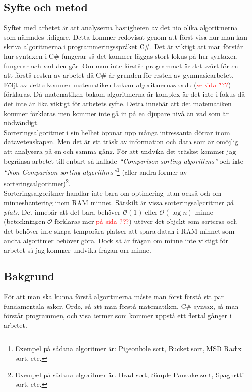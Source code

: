 \documentclass[a4]{article}
\begin{document}
\subsection{Syfte och metod}
Syftet med arbetet är att analyserna hastigheten av det nio olika algoritmerna som nämndes tidigare. Detta kommer redovisat genom att först visa hur man kan skriva algoritmerna i programmeringsspråket C\#. Det är viktigt att man förstår hur syntaxen i C\# fungerar så det kommer läggas stort fokus på hur syntaxen fungerar och vad den gör. Om man inte förstår programmet är det svårt för en att förstå resten av arbetet då C\# är grunden för resten av gymnasiearbetet. Följt av detta kommer matematiken bakom algoritmernas ordo (\textcolor{red}{se sida ???}) förklaras. Då matematiken bakom algoritmerna är komplex är det inte i fokus då det inte är lika viktigt för arbetets syfte. Detta innebär att det matematiken kommer förklaras men kommer inte gå in på en djupare nivå än vad som är nödvändigt.\\
Sorteringsalgoritmer i sin helhet öppnar upp många intressanta dörrar inom datavetenskapen. Men det är ett träsk av information och data som är omöjlig att analysera på en och samma gång. För att undvika det träsket kommer jag begränsa arbetet till enbart så kallade \textit{“Comparison sorting algorithms”} och inte \textit{“Non-Comparison sorting algorithms”}\footnote{Exempel på sådana algoritmer är: Pigeonhole sort, Bucket sort, MSD Radix sort, etc.} (eller andra former av sorteringsalgoritmer)\footnote{Exempel på sådana algoritmer är: Bead sort, Simple Pancake sort, Spaghetti sort, etc.}.\\
Sorteringsalgoritmer handlar inte bara om optimering utan också och om minneshantering inom RAM minnet. Särskilt är vissa sorteringsalgoritmer \textit{på plats}. Det innebär att det bara behöver $\mathcal{O}(1)$ eller $\mathcal{O}(\log{n})$ minne (beteckningen $\mathcal{O}$ förklaras mer \textcolor{red}{på sida ???}) utöver det objekt som sorteras och det behöver inte skapa temporära platser att spara datan i RAM minnet som andra algoritmer behöver göra. \cite{3} Dock så är frågan om minne inte viktigt för arbetet så jag kommer undvika frågan om minne. 

\subsection{Bakgrund}
För att man ska kunna förstå algoritmerna måste man först förstå ett par fundamentala saker. Ordo, så att man förstå matematiken, C\# syntax, så man förstår programmen, och visa termer som kommer uppstå ett flertal gånger i arbetet.%
\end{document}
